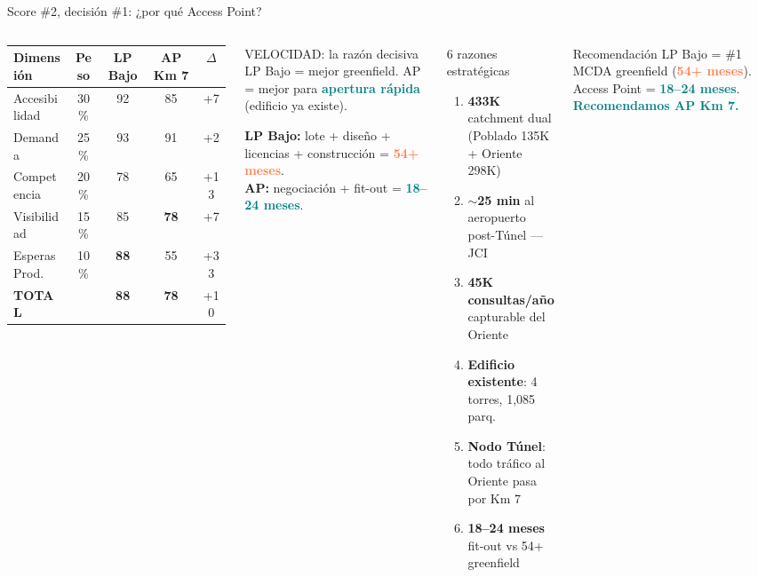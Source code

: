 \documentclass[aspectratio=169, 11pt]{beamer}
\newcommand{\highlight}[1]{\textcolor{teal}{\textbf{#1}}}
\newcommand{\danger}[1]{\textcolor{coral}{\textbf{#1}}}
\begin{document}
{
\begin{frame}{Score \#2, decisión \#1: ¿por qué Access Point?}
\begin{columns}[T]
{\scriptsize\setlength{\tabcolsep}{3pt}
\begin{tabular}{@{}lcccc@{}}
\toprule
\textbf{Dimensión} & \textbf{Peso} & \textbf{LP Bajo} & \textbf{AP Km 7} & \textbf{$\Delta$} \\
\midrule
\rowcolor{teal!6}
Accesibilidad & 30\% & 92 & 85 & +7 \\
Demanda & 25\% & 93 & 91 & +2 \\
\rowcolor{coral!6}
Competencia & 20\% & 78 & 65 & +13 \\
Visibilidad & 15\% & 85 & \textcolor{rose}{\textbf{78}} & +7 \\
\rowcolor{violet!6}
Esperas Prod. & 10\% & \textbf{88} & 55 & +33 \\
\midrule
\textbf{TOTAL} & & \textbf{88} & \textbf{78} & +10 \\
\bottomrule
\end{tabular}
}

\vspace{2pt}
\begin{block}{\small VELOCIDAD: la razón decisiva}
\scriptsize
LP Bajo = mejor greenfield. AP = mejor para \highlight{apertura rápida} (edificio ya existe).

\vspace{2pt}
\textbf{LP Bajo:} lote + diseño + licencias + construcción = \danger{54+ meses}.\\
\textbf{AP:} negociación + fit-out = \highlight{18--24 meses}.
\end{block}

\begin{exampleblock}{\small 6 razones estratégicas}
\scriptsize
\begin{enumerate}\setlength{\itemsep}{1pt}
  \item \textbf{433K} catchment dual (Poblado 135K + Oriente 298K)
  \item \textbf{$\sim$25 min} al aeropuerto post-Túnel --- JCI
  \item \textbf{45K consultas/año} capturable del Oriente
  \item \textbf{Edificio existente}: 4 torres, 1,085 parq.
  \item \textbf{Nodo Túnel}: todo tráfico al Oriente pasa por Km 7
  \item \textbf{18--24 meses} fit-out vs 54+ greenfield
\end{enumerate}
\end{exampleblock}

\vspace{2pt}
\begin{alertblock}{\small Recomendación}
\centering\scriptsize
LP Bajo = \#1 MCDA greenfield (\danger{54+ meses}).
Access Point = \highlight{18--24 meses}. \highlight{Recomendamos AP Km 7.}
\end{alertblock}
\end{columns}
\end{frame}
}
\end{document}
